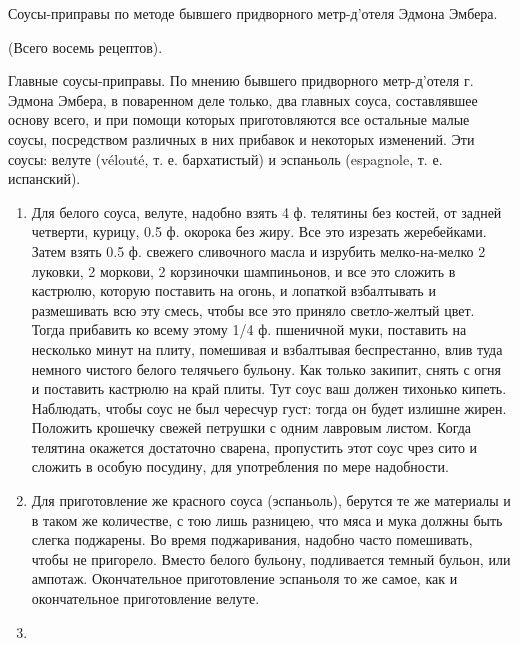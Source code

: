 Соусы-приправы по методе бывшего придворного метр-д'отеля Эдмона Эмбера.

(Всего восемь рецептов).

Главные соусы-приправы. По мнению бывшего придворного метр-д'отеля г. Эдмона Эмбера, в поваренном деле только, два главных соуса, составлявшее основу всего, и при помощи которых приготовляются все остальные малые соусы, посредством различных в них прибавок и некоторых изменений. Эти соусы: велуте (vélouté, т. е. бархатистый) и эспаньоль (espagnole, т. е. испанский).

\begin{enumerate}
	\item {}

Для белого соуса, велуте, надобно взять 4 ф. телятины без костей, от задней четверти, курицу, 0.5 ф. окорока без жиру. Все это изрезать жеребейками. Затем взять 0.5 ф. свежего сливочного масла и изрубить мелко-на-мелко 2 луковки, 2 моркови, 2 корзиночки шампиньонов, и все это сложить в кастрюлю, которую поставить на огонь, и лопаткой взбалтывать и размешивать всю эту смесь, чтобы все это приняло светло-желтый цвет. Тогда прибавить ко всему этому 1/4 ф. пшеничной муки, поставить на несколько минут на плиту, помешивая и взбалтывая беспрестанно, влив туда немного чистого белого телячьего бульону. Как только закипит, снять с огня и поставить кастрюлю на край плиты. Тут соус ваш должен тихонько кипеть. Наблюдать, чтобы соус не был чересчур густ: тогда он будет излишне жирен. Положить крошечку свежей петрушки с одним лавровым листом. Когда телятина окажется достаточно сварена, пропустить этот соус чрез сито и сложить в особую посудину, для употребления по мере надобности.

	\item {}

Для приготовление же красного соуса (эспаньоль), берутся те же материалы и в таком же количестве, с тою лишь разницею, что мяса и мука должны быть слегка поджарены. Во время поджаривания, надобно часто помешивать, чтобы не пригорело. Вместо белого бульону, подливается темный бульон, или ампотаж. Окончательное приготовление эспаньоля то же самое, как и окончательное приготовление велуте.

	\item {}


\end{enumerate}

